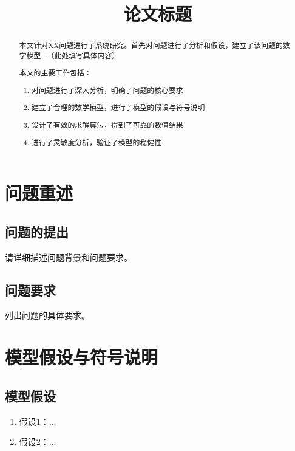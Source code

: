 \documentclass{cumcmthesis}
\title{论文标题}
\begin{document}
\maketitle

\begin{abstract}
本文针对XX问题进行了系统研究。首先对问题进行了分析和假设，建立了该问题的数学模型...（此处填写具体内容）
\begin{mdframed}[roundcorner=5pt,linecolor=gray!50,outerlinewidth=0.5pt,middlelinewidth=0.3pt,backgroundcolor=gray!2]
本文的主要工作包括：
\begin{enumerate}
\item 对问题进行了深入分析，明确了问题的核心要求
\item 建立了合理的数学模型，进行了模型的假设与符号说明
\item 设计了有效的求解算法，得到了可靠的数值结果
\item 进行了灵敏度分析，验证了模型的稳健性
\end{enumerate}
\end{mdframed}
\end{abstract}

\newpage

\section{问题重述}
\subsection{问题的提出}
请详细描述问题背景和问题要求。

\subsection{问题要求}
列出问题的具体要求。

\section{模型假设与符号说明}
\subsection{模型假设}
\begin{enumerate}
\item 假设1：...
\item 假设2：...
\end{enumerate}
\end{document}

